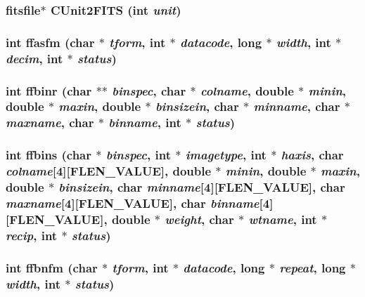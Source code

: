 \subsubsection{\setlength{\rightskip}{0pt plus 5cm}\bf{fitsfile}$\ast$ CUnit2FITS (int {\em unit})}\label{fitsio_8h_e08abd96bc54834ccfe5441c26d459de}


\subsubsection{\setlength{\rightskip}{0pt plus 5cm}int ffasfm (char $\ast$ {\em tform}, int $\ast$ {\em datacode}, long $\ast$ {\em width}, int $\ast$ {\em decim}, int $\ast$ {\em status})}\label{fitsio_8h_e10ab520ca972149eb9fafabd21a1606}


\subsubsection{\setlength{\rightskip}{0pt plus 5cm}int ffbinr (char $\ast$$\ast$ {\em binspec}, char $\ast$ {\em colname}, double $\ast$ {\em minin}, double $\ast$ {\em maxin}, double $\ast$ {\em binsizein}, char $\ast$ {\em minname}, char $\ast$ {\em maxname}, char $\ast$ {\em binname}, int $\ast$ {\em status})}\label{fitsio_8h_f9daf75aaa15d49359ba6fe025e80b86}


\subsubsection{\setlength{\rightskip}{0pt plus 5cm}int ffbins (char $\ast$ {\em binspec}, int $\ast$ {\em imagetype}, int $\ast$ {\em haxis}, char {\em colname}[4][FLEN\_\-VALUE], double $\ast$ {\em minin}, double $\ast$ {\em maxin}, double $\ast$ {\em binsizein}, char {\em minname}[4][FLEN\_\-VALUE], char {\em maxname}[4][FLEN\_\-VALUE], char {\em binname}[4][FLEN\_\-VALUE], double $\ast$ {\em weight}, char $\ast$ {\em wtname}, int $\ast$ {\em recip}, int $\ast$ {\em status})}\label{fitsio_8h_25532ba78224456d371c8724bdbc485f}


\subsubsection{\setlength{\rightskip}{0pt plus 5cm}int ffbnfm (char $\ast$ {\em tform}, int $\ast$ {\em datacode}, long $\ast$ {\em repeat}, long $\ast$ {\em width}, int $\ast$ {\em status})}\label{fitsio_8h_cfe4b7969d8e7484d15510380edd2b57}


